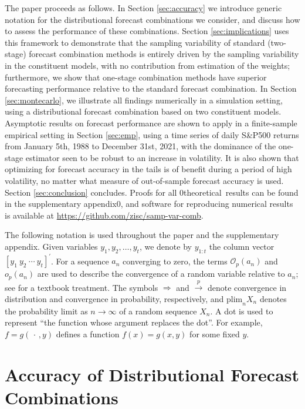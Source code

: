 \documentclass[12pt]{article}
\newcommand{\blind}{0}
\theoremstyle{definition}
\theoremstyle{remark}
\begin{document}
{The paper proceeds as follows. In Section \ref{sec:accuracy} we introduce generic notation for the distributional forecast combinations we consider, and discuss how to assess the performance of these combinations. Section \ref{sec:implications} uses this framework to demonstrate that the sampling variability of standard (two-stage) forecast combination methods is entirely driven by the sampling variability in the constituent models, with no contribution from estimation of the weights; furthermore, we show that one-stage combination methods have superior forecasting performance relative to the standard forecast combination. In Section \ref{sec:montecarlo}, we illustrate all findings numerically in a simulation setting, using a distributional forecast combination based on two constituent models. Asymptotic results on forecast performance are shown to apply in a finite-sample empirical setting in Section \ref{sec:emp}, using a time series of daily S\&P500 returns from January 5th, 1988 to December 31st, 2021, with the dominance of the one-stage estimator seen to be robust to an increase in volatility. It is also shown that optimizing for forecast accuracy in the tails is of benefit during a period of high volatility, no matter what measure of out-of-sample forecast accuracy is used. Section \ref{sec:conclusion} concludes. Proofs for all \blind{theoretical\ }\fi results can be found in the supplementary appendix\blind{, and software for reproducing numerical results is available at \href{https://github.com/zisc/samp-var-comb}{https://github.com/zisc/samp-var-comb}}\fi.

The following notation is used throughout the paper and the supplementary appendix. Given variables $y_{1},y_{2},\ldots ,y_{t}$, we denote by $y_{1:t}$ the column vector $[y_{1}\ y_{2}\ \cdots \ y_{t}]^{\prime }$. For a sequence $a_{n}$ converging to zero, the terms $\mathcal{O}_{p}(a_{n})$ and $o_{p}(a_{n})$ are used to describe the convergence of a random variable relative to $a_{n}$; see \cite{VanDerVaart1998} for a textbook treatment. The symbols $\Rightarrow $ and $\overset{p}{\rightarrow }$ denote convergence in distribution and convergence in probability, respectively, and $\mathrm{plim}_n X_n$ denotes the probability limit as $n \to \infty$ of a random sequence $X_n$. A dot is used to represent \textquotedblleft the function whose argument replaces the dot\textquotedblright . For example, $f=g(\,\cdot \,,y)$ defines a function $f(x)=g(x,y)$ for some fixed $y$.

\section{Accuracy of Distributional Forecast Combinations\label{sec:accuracy}}

}
\end{document}
